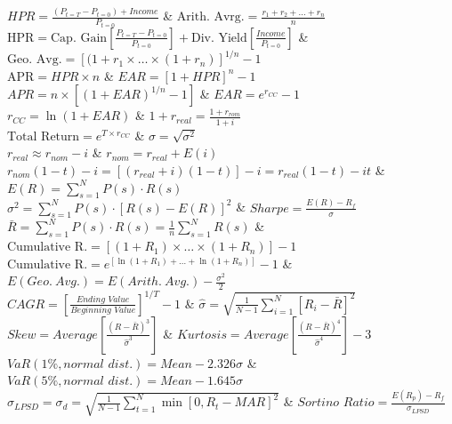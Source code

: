 $HPR = \frac{(P_{t=T} - P_{t=0}) + Income}{P_{t=0}}$ & $ \text{Arith. Avrg.} = \frac{r_{1}+r_{2}+\dots +r_{n}}{n}$ \\



$\text{HPR} = \text{Cap. Gain} \left[\frac{P_{t=T} - P_{t=0}}{P_{t=0}} \right] + \text{Div. Yield} \left[\frac{Income}{P_{t=0}}\right]$ &  $\text{Geo. Avg.} = \left[ (1+r_{1} \times \dots \times (1+r_{n})\right]^{1/n}-1$ \\



$\textrm{APR} = HPR \times n$ & $EAR = \left[ 1 + HPR\right]^{n}-1$\\
$ APR = n \times \left[ (1 + EAR)^{1/n} - 1 \right]$ & $ EAR = e^{r_{CC}} - 1$ \\

$r_{CC} = \ln(1+EAR)$ & $1+r_{real} = \frac{1+r_{rom}}{1+i}$ \\

$\text{Total Return} = e^{T \times r_{CC}}$ & $ \sigma = \sqrt{\sigma^{2}}$\\
$ r_{real} \approx r_{nom} - i$ & $r_{nom} = r_{real} +E(i)$\\


$ r_{nom}(1-t) - i = [(r_{real} + i)(1-t)] - i = r_{real}(1-t) - it$ & $E(R) = \sum_{s=1}^{N} P(s)\cdot R(s)$ \\

$\sigma^{2} = \sum_{s=1}^{N} P(s)\cdot\left[R(s) - E(R)\right]^{2}$ & $Sharpe = \frac{E(R)-R_{f}}{\sigma}$ \\

$ \bar{R} = \sum_{s=1}^{N} P(s)\cdot R(s) = \frac{1}{n}\sum_{s=1}^{N}R(s)$ & $\text{Cumulative R.}  = \left[ (1+R_{1})\times \dots \times (1+R_{n})\right] - 1$ \\

$\text{Cumulative R.} = e^{\left[\ln(1+R_{1}) + \dots + \ln(1+R_{n})\right]} - 1$ & $ E(Geo. \: Avg.) = E(Arith. \: Avg.) - \frac{\sigma^{2}}{2}$ \\


$CAGR = \left[ \frac{Ending \,\, Value}{Beginning \,\, Value}\right]^{1/T} -1$ & $ \hat{\sigma} = \sqrt{\frac{1}{N-1} \sum_{i=1}^{N} \left[R_{i} - \bar{R}\right]^{2}}$ \\

$Skew = Average\left[\frac{(R-\bar{R})^{3}}{\hat{\sigma}^{3}}\right]$ & $ Kurtosis = Average\left[\frac{(R-\bar{R})^{4}}{\hat{\sigma}^{4}}\right] -3$ \\


$VaR(1\%, normal \,\, dist.) = Mean - 2.326 \sigma$ & $VaR(5\%, normal \,\, dist.) = Mean - 1.645 \sigma $ \\

$\sigma_{LPSD} = \sigma_{d} = \sqrt{\frac{1}{N-1} \sum_{t=1}^N \min[0, R_t - MAR]^{2}}$ & $ Sortino \,\, Ratio = \frac{E(R_{p}) - R_{f}}{\sigma_{LPSD}}$ \\
